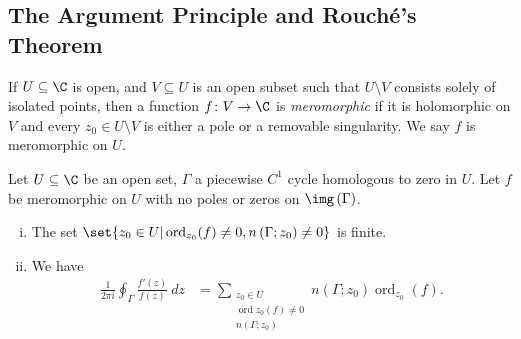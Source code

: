 \documentclass[10pt]{mypackage}
\DeclareMathOperator{\ord}{ord}
\begin{document}
\subsection{The Argument Principle and Rouché's Theorem}%
\begin{definition}
  If $U\subseteq \C$ is open, and $V\subseteq U$ is an open subset such that $U\setminus V$ consists solely of isolated points, then a function $f\colon V\rightarrow \C$ is \textit{meromorphic} if it is holomorphic on $V$ and every $z_0\in U\setminus V$ is either a pole or a removable singularity. We say $f$ is meromorphic on $U$.
\end{definition}
\begin{theorem}
  Let $U\subseteq \C$ be an open set, $\Gamma$ a piecewise $C^{1}$ cycle homologous to zero in $U$. Let $f$ be meromorphic on $U$ with no poles or zeros on $\img\left( \Gamma \right)$.
  \begin{enumerate}[(i)]
    \item The set $\set{z_0 \in U | \operatorname{ord}_{z_0}(f)\neq 0,n\left( \Gamma;z_0 \right) \neq 0}$ is finite.
    \item We have
      \begin{align*}
        \frac{1}{2\pi i} \oint_{\Gamma}^{} \frac{f'(z)}{f(z)}\:dz &= \sum_{\substack{z_0\in U \\ \operatorname{ord}{z_0}(f)\neq 0\\n\left( \Gamma;z_0 \right)}} n\left( \Gamma;z_0 \right)\ord_{z_0}(f).
      \end{align*}
  \end{enumerate}
\end{theorem}
\end{document}
